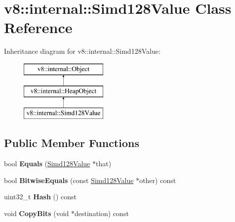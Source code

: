 \hypertarget{classv8_1_1internal_1_1_simd128_value}{}\section{v8\+:\+:internal\+:\+:Simd128\+Value Class Reference}
\label{classv8_1_1internal_1_1_simd128_value}
Inheritance diagram for v8\+:\+:internal\+:\+:Simd128\+Value\+:\begin{figure}[H]
\begin{center}
\leavevmode
\includegraphics[height=3.000000cm]{classv8_1_1internal_1_1_simd128_value}
\end{center}
\end{figure}
\subsection*{Public Member Functions}
\begin{DoxyCompactItemize}
\item 
bool {\bfseries Equals} (\hyperlink{classv8_1_1internal_1_1_simd128_value}{Simd128\+Value} $\ast$that)\hypertarget{classv8_1_1internal_1_1_simd128_value_ad1ee38eeb1c0028a274f7d8b117ba482}{}\label{classv8_1_1internal_1_1_simd128_value_ad1ee38eeb1c0028a274f7d8b117ba482}

\item 
bool {\bfseries Bitwise\+Equals} (const \hyperlink{classv8_1_1internal_1_1_simd128_value}{Simd128\+Value} $\ast$other) const \hypertarget{classv8_1_1internal_1_1_simd128_value_af11ee9f586d504173560a17b5c22159e}{}\label{classv8_1_1internal_1_1_simd128_value_af11ee9f586d504173560a17b5c22159e}

\item 
uint32\+\_\+t {\bfseries Hash} () const \hypertarget{classv8_1_1internal_1_1_simd128_value_a5e15748b36310cded1e572d592e63499}{}\label{classv8_1_1internal_1_1_simd128_value_a5e15748b36310cded1e572d592e63499}

\item 
void {\bfseries Copy\+Bits} (void $\ast$destination) const \hypertarget{classv8_1_1internal_1_1_simd128_value_a9660007248f4529b09f9fe5863965ba5}{}\label{classv8_1_1internal_1_1_simd128_value_a9660007248f4529b09f9fe5863965ba5}

\end{DoxyCompactItemize}

